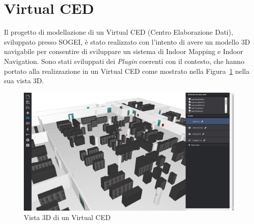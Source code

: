 \section{Virtual CED}
\label{sec:chapter_4_section_3}
Il progetto di modellazione di un Virtual CED (Centro Elaborazione Dati), sviluppato presso SOGEI, \`e stato realizzato con
l'intento di avere un modello 3D navigabile per consentire di sviluppare un sistema di Indoor Mapping e Indoor Navigation.
Sono stati sviluppati dei \emph{Plugin} coerenti con il contesto, che hanno portato alla realizzazione in un
Virtual CED come mostrato nella Figura~\ref{fig:virtualCED} nella sua vista 3D.\\

\begin{figure}[htbp] %
   \centering
   \includegraphics[width=1\linewidth]{images/virtualCED}
   \caption{Vista 3D di un Virtual CED}
   \label{fig:virtualCED}
   \end{figure}
\newpage

